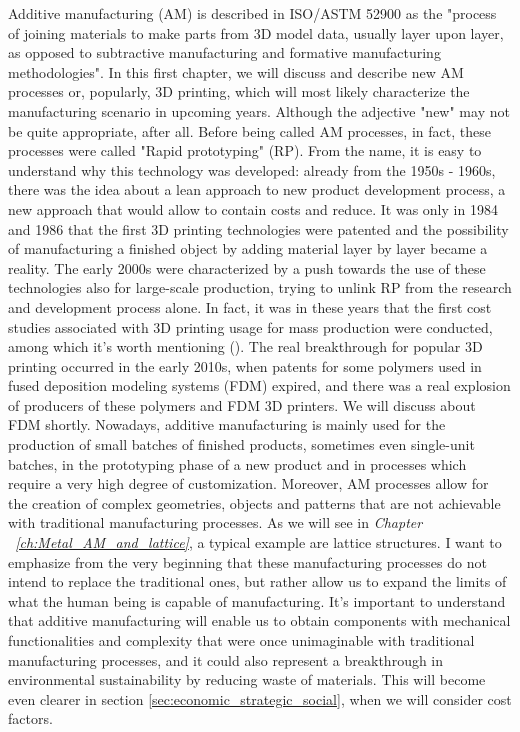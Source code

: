 Additive manufacturing (AM) is described in ISO/ASTM 52900 \cite{international_standard_organization_isoastm_2015} as the "process of joining materials to make parts from 3D model data, usually layer upon layer, as opposed to subtractive manufacturing and formative manufacturing methodologies".
In this first chapter, we will discuss and describe new AM processes or, popularly, 3D printing, which will most likely characterize the manufacturing scenario in upcoming years. Although the adjective "new" may not be quite appropriate, after all. Before being called AM processes, in fact, these processes were called "Rapid prototyping" (RP). From the name, it is easy to understand why this technology was developed: already from the 1950s - 1960s, there was the idea about a lean approach to new product development process, a new approach that would allow to contain costs and reduce. It was only in 1984 and 1986 that the first 3D printing technologies were patented and the possibility of manufacturing a finished object by adding material layer by layer became a reality. The early 2000s were characterized by a push towards the use of these technologies also for large-scale production, trying to unlink RP from the research and development process alone. In fact, it was in these years that the first cost studies associated with 3D printing usage for mass production were conducted, among which it's worth mentioning \citeauthor{hopkinson_analysis_2003} (\citeyear{hopkinson_analysis_2003}). The real breakthrough for popular 3D printing occurred in the early 2010s, when patents for some polymers used in fused deposition modeling systems (FDM) expired, and there was a real explosion of producers of these polymers and FDM 3D printers. We will discuss about FDM shortly. Nowadays, additive manufacturing is mainly used for the production of small batches of finished products, sometimes even single-unit batches, in the prototyping phase of a new product and in processes which require a very high degree of customization. Moreover, AM processes allow for the creation of complex geometries, objects and patterns that are not achievable with traditional manufacturing processes. As we will see in \textit{Chapter ~\ref{ch:Metal_AM_and_lattice}}, a typical example are lattice structures. 
I want to emphasize from the very beginning that these manufacturing processes do not intend to replace the traditional ones, but rather allow us to expand the limits of what the human being is capable of manufacturing. It's important to understand that additive manufacturing will enable us to obtain components with mechanical functionalities and complexity that were once unimaginable with traditional manufacturing processes, and it could also represent a breakthrough in environmental sustainability by reducing waste of materials. This will become even clearer in section \ref{sec:economic_strategic_social}, when we will consider cost factors.


